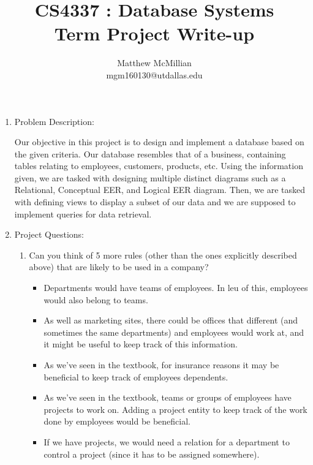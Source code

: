 \documentclass[12pt]{article}
\begin{document}
\title{CS4337 : Database Systems\\Term Project Write-up}
\author{Matthew McMillian\\mgm160130@utdallas.edu}
\maketitle


\begin{enumerate}
	
	\item Problem Description:	
	\begin{center}
		Our objective in this project is to design and implement a database based on the given criteria. Our database resembles that of a business, containing tables relating to employees, customers, products, etc. Using the information given, we are tasked with designing multiple distinct diagrams such as a Relational, Conceptual EER, and Logical EER diagram. Then, we are tasked with defining views to display a subset of our data and we are supposed to implement queries for data retrieval.
	\end{center}
	
	\item Project Questions:
		\begin{enumerate}
			\item Can you think of 5 more rules (other than the ones explicitly described above) that are likely to be used in a company? \\
				\begin{itemize}
					\item Departments would have teams of employees. In leu of this, employees would also belong to teams.
					\item  As well as marketing sites, there could be offices that different (and sometimes the same departments) and employees would work at, and it might be useful to keep track of this information.
					\item As we've seen in the textbook, for insurance reasons it may be beneficial to keep track of employees dependents.
					\item As we've seen in the textbook, teams or groups of employees have projects to work on. Adding a project entity to keep track of the work done by employees would be beneficial.
					\item If we have projects, we would need a relation for a department to control a project (since it has to be assigned somewhere).
				\end{itemize}
				

\end{enumerate}
\end{enumerate}
\end{document}
